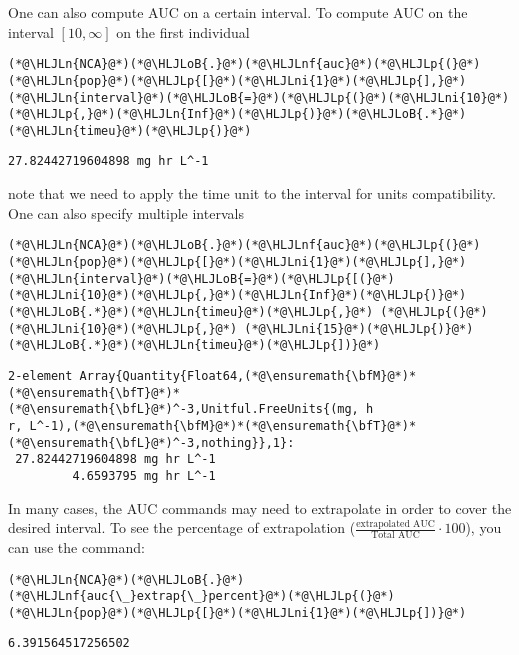 \documentclass[12pt,a4paper]{article}
\newcommand{\HLJLn}[1]{#1}
\newcommand{\HLJLnf}[1]{\textcolor[RGB]{66,102,213}{#1}}
\newcommand{\HLJLni}[1]{\textcolor[RGB]{59,151,46}{#1}}
\newcommand{\HLJLoB}[1]{\textcolor[RGB]{102,102,102}{\textbf{#1}}}
\newcommand{\HLJLp}[1]{#1}
\begin{document}
One can also compute AUC on a certain interval. To compute AUC on the interval $[10, \infty]$ on the first individual


\begin{lstlisting}
(*@\HLJLn{NCA}@*)(*@\HLJLoB{.}@*)(*@\HLJLnf{auc}@*)(*@\HLJLp{(}@*)(*@\HLJLn{pop}@*)(*@\HLJLp{[}@*)(*@\HLJLni{1}@*)(*@\HLJLp{],}@*) (*@\HLJLn{interval}@*)(*@\HLJLoB{=}@*)(*@\HLJLp{(}@*)(*@\HLJLni{10}@*)(*@\HLJLp{,}@*)(*@\HLJLn{Inf}@*)(*@\HLJLp{)}@*)(*@\HLJLoB{.*}@*)(*@\HLJLn{timeu}@*)(*@\HLJLp{)}@*)
\end{lstlisting}

\begin{lstlisting}
27.82442719604898 mg hr L^-1
\end{lstlisting}


note that we need to apply the time unit to the interval for units compatibility. One can also specify multiple intervals


\begin{lstlisting}
(*@\HLJLn{NCA}@*)(*@\HLJLoB{.}@*)(*@\HLJLnf{auc}@*)(*@\HLJLp{(}@*)(*@\HLJLn{pop}@*)(*@\HLJLp{[}@*)(*@\HLJLni{1}@*)(*@\HLJLp{],}@*) (*@\HLJLn{interval}@*)(*@\HLJLoB{=}@*)(*@\HLJLp{[(}@*)(*@\HLJLni{10}@*)(*@\HLJLp{,}@*)(*@\HLJLn{Inf}@*)(*@\HLJLp{)}@*)(*@\HLJLoB{.*}@*)(*@\HLJLn{timeu}@*)(*@\HLJLp{,}@*) (*@\HLJLp{(}@*)(*@\HLJLni{10}@*)(*@\HLJLp{,}@*) (*@\HLJLni{15}@*)(*@\HLJLp{)}@*)(*@\HLJLoB{.*}@*)(*@\HLJLn{timeu}@*)(*@\HLJLp{])}@*)
\end{lstlisting}

\begin{lstlisting}
2-element Array{Quantity{Float64,(*@\ensuremath{\bfM}@*)*(*@\ensuremath{\bfT}@*)*(*@\ensuremath{\bfL}@*)^-3,Unitful.FreeUnits{(mg, h
r, L^-1),(*@\ensuremath{\bfM}@*)*(*@\ensuremath{\bfT}@*)*(*@\ensuremath{\bfL}@*)^-3,nothing}},1}:
 27.82442719604898 mg hr L^-1
         4.6593795 mg hr L^-1
\end{lstlisting}


In many cases, the AUC commands may need to extrapolate in order to cover the desired interval. To see the percentage of extrapolation ($\frac{\text{extrapolated AUC}}{\text{Total AUC}}\cdot 100$), you can use the command:


\begin{lstlisting}
(*@\HLJLn{NCA}@*)(*@\HLJLoB{.}@*)(*@\HLJLnf{auc{\_}extrap{\_}percent}@*)(*@\HLJLp{(}@*)(*@\HLJLn{pop}@*)(*@\HLJLp{[}@*)(*@\HLJLni{1}@*)(*@\HLJLp{])}@*)
\end{lstlisting}

\begin{lstlisting}
6.391564517256502
\end{lstlisting}
\end{document}
